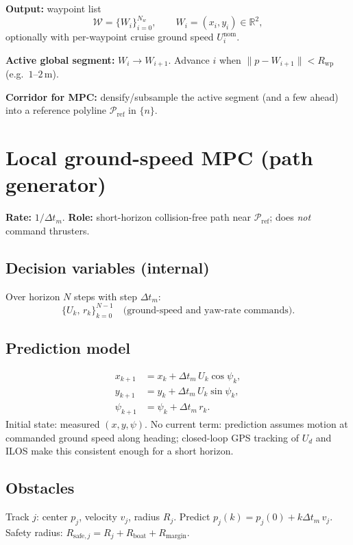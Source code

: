 \documentclass[11pt,a4paper]{article}
\begin{document}
\textbf{Output:} waypoint list
\[
\mathcal{W}=\{W_i\}_{i=0}^{N_w},\qquad
W_i=(x_i,y_i)\in\mathbb{R}^2,
\]
optionally with per-waypoint cruise ground speed \(U_i^{\mathrm{nom}}\).

\textbf{Active global segment:} \(W_i\to W_{i+1}\).
Advance \(i\) when \(\|p-W_{i+1}\|<R_{\mathrm{wp}}\) (e.g.\ \(1\)--\(2\,\mathrm{m}\)).

\textbf{Corridor for MPC:} densify/subsample the active segment (and a few ahead)
into a reference polyline \(\mathcal{P}_{\mathrm{ref}}\) in \(\{n\}\).

\section{Local ground-speed MPC (path generator)}

\textbf{Rate:} \(1/\Delta t_m\).
\textbf{Role:} short-horizon collision-free path near \(\mathcal{P}_{\mathrm{ref}}\);
does \emph{not} command thrusters.

\subsection{Decision variables (internal)}
Over horizon \(N\) steps with step \(\Delta t_m\):
\[
\{U_k,\, r_k\}_{k=0}^{N-1}
\quad\text{(ground-speed and yaw-rate commands).}
\]

\subsection{Prediction model}
\[
\begin{aligned}
x_{k+1}
  &= x_k + \Delta t_m\, U_k\cos\psi_k, \\
y_{k+1}
  &= y_k + \Delta t_m\, U_k\sin\psi_k, \\
\psi_{k+1}
  &= \psi_k + \Delta t_m\, r_k.
\end{aligned}
\]
Initial state: measured \((x,y,\psi)\).
No current term: prediction assumes motion at commanded ground speed along
heading; closed-loop GPS tracking of \(U_d\) and ILOS make this consistent
enough for a short horizon.

\subsection{Obstacles}
Track \(j\): center \(p_j\), velocity \(v_j\), radius \(R_j\).
Predict \(p_j(k)=p_j(0)+k\Delta t_m\,v_j\).
Safety radius:
\(R_{\mathrm{safe},j}=R_j+R_{\mathrm{boat}}+R_{\mathrm{margin}}\).
\end{document}
